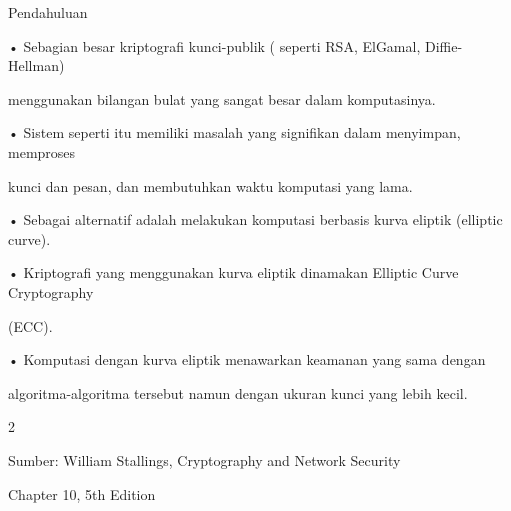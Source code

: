 \documentclass{article}
\begin{document}

Pendahuluan

• Sebagian besar kriptografi kunci-publik ( seperti RSA, ElGamal, Diffie-Hellman) 

menggunakan bilangan bulat yang sangat besar dalam komputasinya.

• Sistem seperti itu memiliki masalah yang signifikan dalam menyimpan, memproses 

kunci dan pesan, dan membutuhkan waktu komputasi yang lama.

• Sebagai alternatif adalah melakukan komputasi berbasis kurva eliptik (elliptic curve). 

• Kriptografi yang menggunakan kurva eliptik dinamakan Elliptic Curve Cryptography 

(ECC). 

• Komputasi dengan kurva eliptik menawarkan keamanan yang sama dengan 

algoritma-algoritma tersebut namun dengan ukuran kunci yang lebih kecil.  

2

Sumber: William Stallings, Cryptography and Network Security

Chapter 10, 5th Edition
\end{document}
